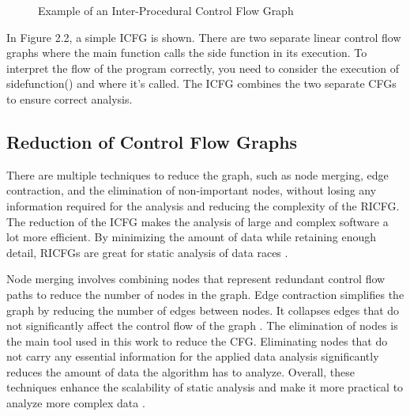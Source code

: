 \documentclass[
fancyheadings, %
%
%
]{stsreprt}
\begin{document}
{\begin{figure}[H]
			\caption{Example of an Inter-Procedural Control Flow Graph}
		\end{figure}
		
		In Figure 2.2, a simple ICFG is shown. There are two separate linear control flow graphs where the main function calls the side function in its execution. To interpret the flow of the program correctly, you need to consider the execution of sidefunction() and where it's called. The ICFG combines the two separate CFGs to ensure correct analysis.
		
		\subsection{Reduction of Control Flow Graphs}
		There are multiple techniques to reduce the graph, such as node merging, edge contraction, and the elimination of non-important nodes, without losing any information required for the analysis and reducing the complexity of the RICFG. The reduction of the ICFG makes the analysis of large and complex software a lot more efficient. By minimizing the amount of data while retaining enough detail, RICFGs are great for static analysis of data races \cite{wang2020}.
		
		Node merging involves combining nodes that represent redundant control flow paths to reduce the number of nodes in the graph. Edge contraction simplifies the graph by reducing the number of edges between nodes. It collapses edges that do not significantly affect the control flow of the graph \cite{muchnick1997}. The elimination of nodes is the main tool used in this work to reduce the CFG. Eliminating nodes that do not carry any essential information for the applied data analysis significantly reduces the amount of data the algorithm has to analyze. Overall, these techniques enhance the scalability of static analysis and make it more practical to analyze more complex data \cite{wang2020}.
		
}
\end{document}
